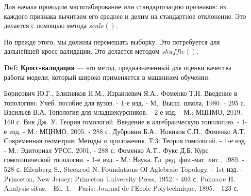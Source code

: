\documentclass[12pt, openany, oneside]{book}
\theoremstyle{definition}
\theoremstyle{remark}
\numberwithin{equation}{section}
\numberwithin{equation}{section}
\newcommand{\0}{\varnothing}
\begin{document}
	Для начала проводим масштабирование или стандартизацию признаков: из каждого признака вычитаем его среднее и делим на стандартное отклонение. Это делается с помощью метода $scale()$.

	Но прежде этого, мы должны перемешать выборку. Это потребуется для дальнейшей кросс-валидации. Это делается методом $shuffle()$.
	
	\textbf{Def: Кросс-валидация} — это метод, предназначенный для оценки качества работы модели, который широко применяется в машинном обучении.	
	
	
	
	\begin{thebibliography}{99}
		 Борисович Ю.Г., Близняков Н.М., Израилевич Я.А., Фоменко Т.Н. Введение в топологию: Учеб. пособие для вузов. - 1-е изд. - М,: Высш. школа, 1980. - 295 с.
		 Васильев В.А. Топология для младшекурсников. - 2-е изд. - М.: МЦНМО, 2019. - 160 с.
		 Вик Дж. У. Теория гомологий. Введение в алгебраическую топологию. - 1-е изд. - М.: МЦНМО, 2005. - 288 с.
		 Дубровин Б.А., Новиков С.П., Фоменко А.Т. Современная геометрия: Методы и приложения. Т.3: Теория гомологий. - 1-е изд. - М.: Эдиториал УРСС, 2001. - 288 с.
		 Фоменко А.Т., Фукс Д.Б. Курс гомотопической топологии. - 1-е изд. - М,: Наука. Гл. ред. физ.-мат. лит., 1989. - 528 с.
		 Eilenberg S., Steenrod N. Foundations Of Aglebraic Topology. - 1st изд. - Princeton, New Jersey: Princeton University Press, 1952. - 403 с.
		 Poincare H. Analysis situs. - Ed. 1. - Paris: Journal de l'Ecole Polytechnique, 1895. - 123 с.
	\end{thebibliography}
	
\end{document}
